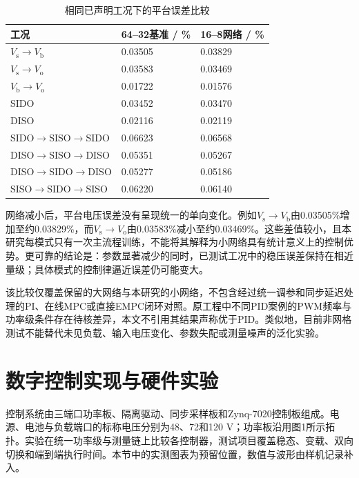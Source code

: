 \documentclass[UTF8,fontset=fandol,a4paper,twocolumn,10pt]{ctexart}
\begin{document}
\begin{table}[!tp]\centering\caption{相同已声明工况下的平台误差比较}\label{tab:7}\small\setlength{\tabcolsep}{3pt}
\begin{tabularx}{\textwidth}{YYY}\toprule
\textbf{工况} & \textbf{64–32基准 / \%} & \textbf{16–8网络 / \%}\\\midrule
$V_{\mathrm s}$$\to$$V_{\mathrm b}$ & 0.03505 & 0.03829\\
$V_{\mathrm s}$$\to$$V_{\mathrm o}$ & 0.03583 & 0.03469\\
$V_{\mathrm b}$$\to$$V_{\mathrm o}$ & 0.01722 & 0.01576\\
SIDO & 0.03452 & 0.03470\\
DISO & 0.02116 & 0.02119\\
SIDO$\to$SISO$\to$SIDO & 0.06623 & 0.06568\\
DISO$\to$SISO$\to$DISO & 0.05351 & 0.05267\\
DISO$\to$SIDO$\to$DISO & 0.05277 & 0.05186\\
SISO$\to$SIDO$\to$SISO & 0.06220 & 0.06140\\
\bottomrule\end{tabularx}
\end{table}

网络减小后，平台电压误差没有呈现统一的单向变化。例如$V_{\mathrm s}$$\to$$V_{\mathrm b}$由0.03505\%增加至约0.03829\%，而$V_{\mathrm s}$$\to$$V_{\mathrm o}$由0.03583\%减小至约0.03469\%。这些差值较小，且本研究每模式只有一次主流程训练，不能将其解释为小网络具有统计意义上的控制优势。更可靠的结论是：参数显著减少的同时，已测试工况中的稳压误差保持在相近量级；具体模式的控制律逼近误差仍可能变大。

该比较仅覆盖保留的大网络与本研究的小网络，不包含经过统一调参和同步延迟处理的PI、在线MPC或直接EMPC闭环对照。原工程中不同PID案例的PWM频率与功率级条件存在待核差异，本文不引用其结果声称优于PID。类似地，目前非网格测试不能替代未见负载、输入电压变化、参数失配或测量噪声的泛化实验。

\FloatBarrier


\section{数字控制实现与硬件实验}

控制系统由三端口功率板、隔离驱动、同步采样板和Zynq-7020控制板组成。电源、电池与负载端口的标称电压分别为48、72和120 V；功率板沿用图1所示拓扑。实验在统一功率级与测量链上比较各控制器，测试项目覆盖稳态、变载、双向切换和端到端执行时间。本节中的实测图表为预留位置，数值与波形由样机记录补入。
\end{document}
